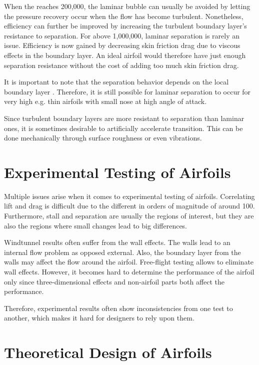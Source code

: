 \documentclass[letterpaper,12pt,]{article}
\begin{document}
When the \rn reaches 200,000, the laminar bubble can usually be avoided by letting the pressure recovery occur when the flow has become turbulent. Nonetheless, efficiency can further be improved by increasing the turbulent boundary layer's resistance to separation. For \rn above 1,000,000, laminar separation is rarely an issue. Efficiency is now gained by decreasing skin friction drag due to viscous effects in the boundary layer. An ideal airfoil would therefore have just enough separation resistance without the cost of adding too much skin friction drag.

It is important to note that the separation behavior depends on the local boundary layer \rn. Therefore, it is still possible for laminar separation to occur for very high \rn e.g. thin airfoils with small nose at high angle of attack.

Since turbulent boundary layers are more resistant to separation than laminar ones, it is sometimes desirable to artificially accelerate transition. This can be done mechanically through surface roughness or even vibrations. 


\section{Experimental Testing of Airfoils}

Multiple issues arise when it comes to experimental testing of airfoils. Correlating lift and drag is difficult due to the different in orders of magnitude of around 100. Furthermore, stall and separation are usually the regions of interest, but they are also the regions where small changes lead to big differences.

Windtunnel results often suffer from the wall effects. The walls lead to an internal flow problem as opposed external. Also, the boundary layer from the walls may affect the flow around the airfoil. Free-flight testing allows to eliminate wall effects. However, it becomes hard to determine the performance of the airfoil only since three-dimensional effects and non-airfoil parts both affect the performance.


Therefore, experimental results often show inconsistencies from one test to another, which makes it hard for designers to rely upon them.

\section{Theoretical Design of Airfoils}
\end{document}
